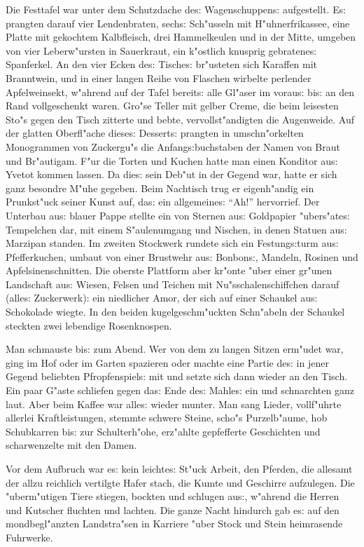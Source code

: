 \documentclass[oneside,12pt]{book}
\newcommand{\s}{s:}%
\begin{document}
Die Festtafel war unter dem Schutzdache de{\s} Wagenschuppen{\s}
aufgestellt. E{\s} prangten darauf vier Lendenbraten, sech{\s}
Sch"usseln mit H"uhnerfrikassee, eine Platte mit gekochtem
Kalbfleisch, drei Hammelkeulen und in der Mitte, umgeben von vier
Leberw"ursten in Sauerkraut, ein k"ostlich knusprig gebratene{\s}
Spanferkel. An den vier Ecken de{\s} Tische{\s} br"usteten sich
Karaffen mit Branntwein, und in einer langen Reihe von Flaschen
wirbelte perlender Apfelweinsekt, w"ahrend auf der Tafel
bereit{\s} alle Gl"aser im vorau{\s} bi{\s} an den Rand
vollgeschenkt waren. Gro"se Teller mit gelber Creme, die beim
leisesten Sto"s gegen den Tisch zitterte und bebte,
vervollst"andigten die Augenweide. Auf der glatten Oberfl"ache
diese{\s} Dessert{\s} prangten in umschn"orkelten Monogrammen von
Zuckergu"s die Anfang{\s}buchstaben der Namen von Braut und
Br"autigam. F"ur die Torten und Kuchen hatte man einen Konditor
au{\s} Yvetot kommen lassen. Da die{\s} sein Deb"ut in der Gegend
war, hatte er sich ganz besondre M"uhe gegeben. Beim Nachtisch
trug er eigenh"andig ein Prunkst"uck seiner Kunst auf, da{\s} ein
allgemeine{\s} "`Ah!"' hervorrief. Der Unterbau au{\s} blauer
Pappe stellte ein von Sternen au{\s} Goldpapier "ubers"ate{\s}
Tempelchen dar, mit einem S"aulenumgang und Nischen, in denen
Statuen au{\s} Marzipan standen. Im zweiten Stockwerk rundete sich
ein Festung{\s}turm au{\s} Pfefferkuchen, umbaut von einer
Brustwehr au{\s} Bonbon{\s}, Mandeln, Rosinen und
Apfelsinenschnitten. Die oberste Plattform aber kr"onte "uber
einer gr"unen Landschaft au{\s} Wiesen, Felsen und Teichen mit
Nu"sschalenschiffchen darauf (alle{\s} Zuckerwerk): ein niedlicher
Amor, der sich auf einer Schaukel au{\s} Schokolade wiegte. In den
beiden kugelgeschm"uckten Schn"abeln der Schaukel steckten zwei
lebendige Rosenknospen.

Man schmauste bi{\s} zum Abend. Wer von dem zu langen Sitzen
erm"udet war, ging im Hof oder im Garten spazieren oder machte
eine Partie de{\s} in jener Gegend beliebten Pfropfenspiel{\s} mit
und setzte sich dann wieder an den Tisch. Ein paar G"aste
schliefen gegen da{\s} Ende de{\s} Mahle{\s} ein und schnarchten
ganz laut. Aber beim Kaffee war alle{\s} wieder munter. Man sang
Lieder, vollf"uhrte allerlei Kraftleistungen, stemmte schwere
Steine, scho"s Purzelb"aume, hob Schubkarren bi{\s} zur
Schulterh"ohe, erz"ahlte gepfefferte Geschichten und scharwenzelte
mit den Damen.

Vor dem Aufbruch war e{\s} kein leichte{\s} St"uck Arbeit, den
Pferden, die allesamt der allzu reichlich vertilgte Hafer stach,
die Kumte und Geschirre aufzulegen. Die "uberm"utigen Tiere
stiegen, bockten und schlugen au{\s}, w"ahrend die Herren und
Kutscher fluchten und lachten. Die ganze Nacht hindurch gab e{\s}
auf den mondbegl"anzten Landstra"sen in Karriere "uber Stock und
Stein heimrasende Fuhrwerke.
\end{document}
